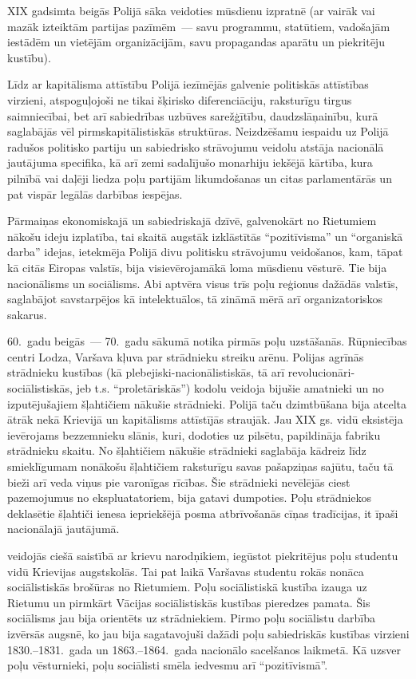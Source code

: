 \documentclass[twoside,a5paper,12pt,fleqn,openany]{extbook}
\begin{document}
XIX gadsimta beigās Polijā sāka veidoties  mūsdienu izpratnē (ar vairāk vai mazāk izteiktām partijas pazīmēm~--- savu programmu, statūtiem, vadošajām iestādēm un vietējām organizācijām, savu propagandas aparātu un piekritēju kustību).

Līdz ar kapitālisma attīstību Polijā iezīmējās galvenie politiskās attīstības virzieni, atspoguļojoši ne tikai šķirisko diferenciāciju, raksturīgu tirgus saimniecībai, bet arī sabiedrības uzbūves sarežģītību, daudzslāņainību, kurā saglabājās vēl pirmskapitālistiskās struktūras. Neizdzēšamu iespaidu uz Polijā radušos politisko partiju un sabiedrisko strāvojumu veidolu atstāja nacionālā jautājuma specifika, kā arī zemi sadalījušo monarhiju iekšējā kārtība, kura pilnībā vai daļēji liedza poļu partijām likumdošanas un citas parlamentārās un pat vispār legālās darbības iespējas.

Pārmaiņas ekonomiskajā un sabiedriskajā dzīvē, galvenokārt no Rietumiem nākošu ideju izplatība, tai skaitā augstāk izklāstītās ``pozitīvisma'' un ``organiskā darba'' idejas, ietekmēja Polijā divu politisku strāvojumu veidošanos, kam, tāpat kā citās Eiropas valstīs, bija visievērojamākā loma mūsdienu vēsturē. Tie bija nacionālisms un sociālisms. Abi aptvēra visus trīs poļu reģionus dažādās valstīs, saglabājot savstarpējos kā intelektuālos, tā zināmā mērā arī organizatoriskos sakarus.

60.~gadu beigās~--- 70.~gadu sākumā notika pirmās poļu  uzstāšanās. Rūpniecības centri Lodza, Varšava kļuva par strādnieku streiku arēnu. Polijas agrīnās strādnieku kustības (kā plebejiski-nacionālistiskās, tā arī revolucionāri-sociālistiskās, jeb t.s. ``proletāriskās'') kodolu veidoja bijušie amatnieki un no izputējušajiem šļahtičiem nākušie strādnieki. Polijā taču dzimtbūšana bija atcelta ātrāk nekā Krievijā un kapitālisms attīstījās straujāk. Jau XIX gs. vidū eksistēja ievērojams bezzemnieku slānis, kuri, dodoties uz pilsētu, papildināja fabriku strādnieku skaitu. No šļahtičiem nākušie strādnieki saglabāja kādreiz līdz smieklīgumam nonākošu šļahtičiem raksturīgu savas pašapziņas sajūtu, taču tā bieži arī veda viņus pie varonīgas rīcības. Šie strādnieki nevēlējās ciest pazemojumus no ekspluatatoriem, bija gatavi dumpoties. Poļu strādniekos deklasētie šļahtiči ienesa iepriekšējā posma atbrīvošanās cīņas tradīcijas, it īpaši nacionālajā jautājumā.

 veidojās ciešā saistībā ar krievu narodņikiem, iegūstot piekritējus poļu studentu vidū Krievijas augstskolās. Tai pat laikā Varšavas studentu rokās nonāca sociālistiskās brošūras no Rietumiem. Poļu sociālistiskā kustība izauga uz Rietumu un pirmkārt Vācijas sociālistiskās kustības pieredzes pamata. Šis sociālisms jau bija orientēts uz strādniekiem. Pirmo poļu sociālistu darbība izvērsās augsnē, ko jau bija sagatavojuši dažādi poļu sabiedriskās kustības virzieni 1830.--1831.~gada un 1863.--1864.~gada nacionālo sacelšanos laikmetā. Kā uzsver poļu vēsturnieki, poļu sociālisti smēla iedvesmu arī ``pozitīvismā''.
\end{document}
